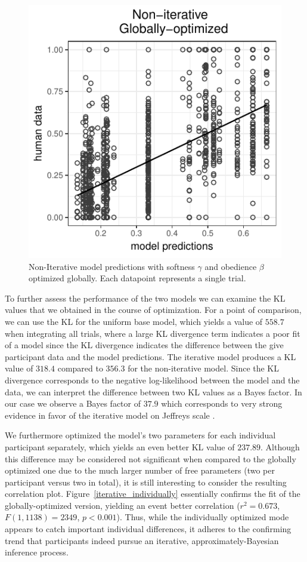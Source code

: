 \documentclass[10pt,a4paper]{article}
\begin{document}
 \begin{figure}[h]
	\centering
	\includegraphics[width=.8\linewidth]{images/m8.pdf}
	\caption{Non-Iterative model predictions with softness $\gamma$ and obedience $\beta$ optimized globally. Each datapoint represents a single trial.}	
	\label{non-iterative}
\end{figure}
 
To further assess the performance of the two models we can examine the KL values that we obtained in the course of optimization.
For a point of comparison, we can use the KL for the uniform base model, which yields a value of $558.7$ when integrating all trials, where a large KL divergence term indicates a poor fit of a model since the KL divergence indicates the difference between the give participant data and the model predictions.
The iterative model produces a KL value of $318.4$ compared to $356.3$ for the non-iterative model. 
Since the KL divergence corresponds to the negative log-likelihood between the model and the data, we can interpret the difference between two KL values as a Bayes factor.
In our case we observe a Bayes factor of $37.9$ which corresponds to very strong evidence in favor of the iterative model on Jeffreys scale \cite{jeffreys1961theory,Lewandowsky:2011}.


We furthermore optimized the model's two parameters for each individual participant separately, which yields an even better KL value of $237.89$.
Although this difference may be considered not significant when compared to the globally optimized one due to the much larger number of free parameters (two per participant versus two in total), it is still interesting to consider the resulting correlation plot. 
Figure~\ref{iterative_individually} essentially confirms the fit of the globally-optimized version, yielding an event better correlation ($r^2=0.673$, $F(1,1138) = 2349$, $p<0.001$).
Thus, while the individually optimized mode appears to catch important individual differences, it adheres to the confirming trend that participants indeed pursue an iterative, approximately-Bayesian inference process. 
\end{document}
